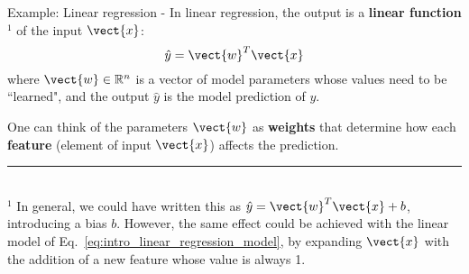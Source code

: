 \begin{frame}[t,allowframebreaks]{
    Example: Linear regression - }
    In \gls{linear regression}, the output is a 
    {\bf linear function}$^{1}$ of the input $\vect{x}$:
    \begin{equation}
        \hat{y} = \vect{w}^T \vect{x}
        \label{eq:intro_linear_regression_model}
    \end{equation}
    where $\vect{w} \in \mathbb{R}^n$ is a vector of model parameters 
    whose values need to be ``learned", and 
    the output $\hat{y}$ is the model prediction of $y$.\\
    \vspace{0.2cm}

    One can think of the parameters $\vect{w}$ as {\bf weights}
    that determine how each {\bf feature} 
    (element of input $\vect{x}$)
    affects the prediction.\\

    \vspace{0.2cm}
    \noindent\rule{4cm}{0.4pt}\\
    {\scriptsize      
      $^{1}$ In general, we could have written this as
      $\hat{y} = \vect{w}^T \vect{x} + b$, introducing a bias $b$.
      However, the same effect could be achieved with the linear model of 
      Eq.~\ref{eq:intro_linear_regression_model}, by expanding $\vect{x}$
      with the addition of a new feature whose value is always 1.\\
    }

    \framebreak



\end{frame}
